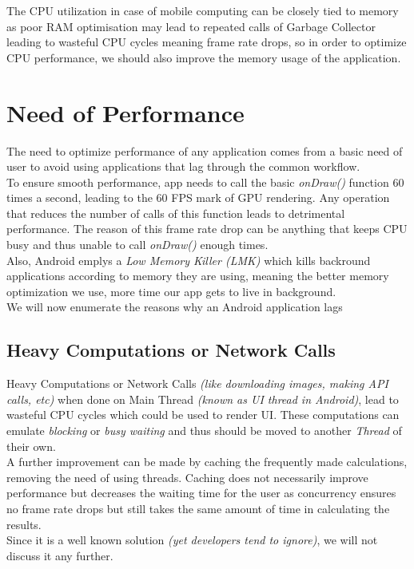 \documentclass[journal]{IEEEtran}
\begin{document}
The CPU utilization in case of mobile computing can be closely tied to memory as poor RAM optimisation may lead to repeated calls of Garbage Collector leading to wasteful CPU cycles meaning frame rate drops, so in order to optimize CPU performance, we should also improve the memory usage of the application.

\section{Need of Performance}
The need to optimize performance of any application comes from a basic need of user to avoid using applications that lag through the common workflow.\\
To ensure smooth performance, app needs to call the basic \emph{onDraw()} function 60 times a second, leading to the 60 FPS mark of GPU rendering. Any operation that reduces the number of calls of this function leads to detrimental performance. The reason of this frame rate drop can be anything that keeps CPU busy and thus unable to call \emph{onDraw()} enough times.\\
Also, Android emplys a \emph{Low Memory Killer (LMK)} which kills backround applications according to memory they are using, meaning the better memory optimization we use, more time our app gets to live in background.\\
We will now enumerate the reasons why an Android application lags


\subsection{Heavy Computations or Network Calls}
Heavy Computations or Network Calls \emph{(like downloading images, making API calls, etc)} when done on Main Thread \emph{(known as UI thread in Android)}, lead to wasteful CPU cycles which could be used to render UI. These computations can emulate \emph{blocking} or \emph{busy waiting} and thus should be moved to another \emph{Thread} of their own.\\
A further improvement can be made by caching the frequently made calculations, removing the need of using threads. Caching does not necessarily improve performance but decreases the waiting time for the user as concurrency ensures no frame rate drops but still takes the same amount of time in calculating the results.\\
Since it is a well known solution \emph{(yet developers tend to ignore)}, we will not discuss it any further.
\end{document}
